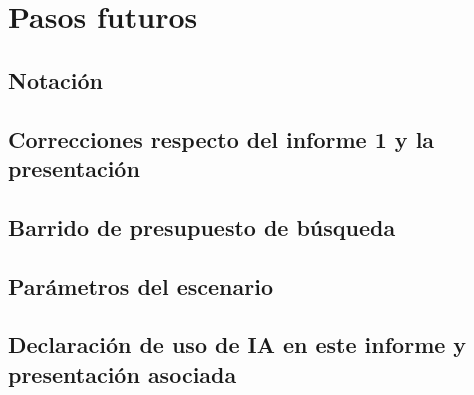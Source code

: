 \documentclass[pdftex,spanish]{pucthesis}	%
\begin{document}
\chapter[PASOS FUTUROS]{Pasos futuros} \label{ch:pasos-futuros}


\cleardoublepage
{} \label{references}

\renewcommand{\bibname}{REFERENCIAS}


\appendix

\newpage
\section[Notación]{Notación} \label{an:notacion}


\newpage
\section[Correcciones respecto del informe 1 y la presentación]{Correcciones respecto del informe 1 y la presentación} \label{an:correcciones}


\newpage
\section[Barrido de presupuesto de búsqueda]{Barrido de presupuesto de búsqueda} \label{an:barrido}


\newpage
\section[Parámetros del escenario]{Parámetros del escenario} \label{an:parametros}


\newpage
\section[Declaración de uso de IA]{Declaración de uso de IA en este informe y presentación asociada} \label{an:ia}

\end{document}
